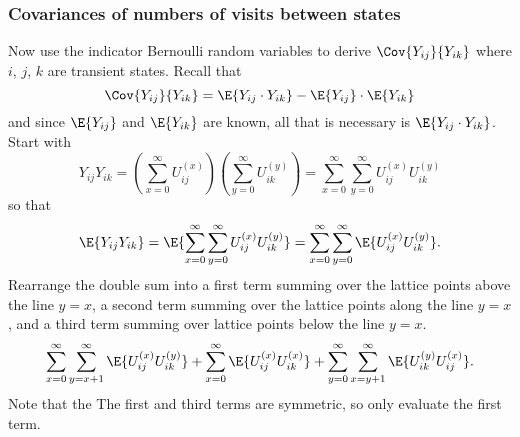 \documentclass[12pt]{article}
\begin{document}
\subsubsection*{Covariances of numbers of visits between states }

Now use the indicator Bernoulli random variables to derive \(
\Cov{ Y_{ij} }{ Y_{ik} } \) where \( i \), \( j \), \( k \) are transient
states. Recall that
\[
    \Cov{ Y_{ij} }{ Y_{ik} } = \E{Y_{ij} \cdot Y_{ik}} - \E{Y_{ij}}
    \cdot \E{Y_{ik}}
\] and since \( \E{Y_{ij}} \) and \( \E{Y_{ik}} \) are known, all
that is necessary is \( \E{Y_{ij} \cdot Y_{ik}} \).  Start with
\[
    Y_{ij} Y_{ik} = \left( \sum\limits_{x=0}^{\infty} U_{ij}^{(x)}
    \right) \left( \sum\limits_{y=0}^{\infty} U_{ik}^{(y)} \right) =
    \sum\limits_{x=0}^{\infty} \sum\limits_{y=0}^{\infty} U_{ij}^{(x)} U_
    {ik}^{(y)}
\] so that
\[
    \E{Y_{ij} Y_{ik}} = \E{\sum\limits_{x=0}^{\infty} \sum\limits_{y=0}^
    {\infty} U_{ij}^{(x)} U_{ik}^{(y)}} = \sum\limits_{x=0}^{\infty}
    \sum\limits_{y=0}^{\infty} \E{U_{ij}^{(x)} U_{ik}^{(y)}}.
  \]
  Rearrange the double sum into a
   first term summing over the lattice points above the line \(
y=x \), a second term summing over the lattice points along the line \(
y=x \), and a third term summing over lattice points below the line \( y=x \).
\[
    \sum\limits_{x=0}^{\infty} \sum\limits_{y=x+1}^{\infty} \E{U_{ij}^{(x)}
    U_{ik}^{(y)}} + \sum\limits_{x=0}^{\infty} \E{U_{ij}^{(x)} U_{ik}^{(x)}}
    + \sum\limits_{y=0}^{\infty} \sum\limits_{x=y+1}^{\infty} \E{U_{ik}^
    {(y)} U_{ij}^{(x)}}.
\] Note that the
The first and third terms are symmetric, so only evaluate the first
term.
\end{document}
